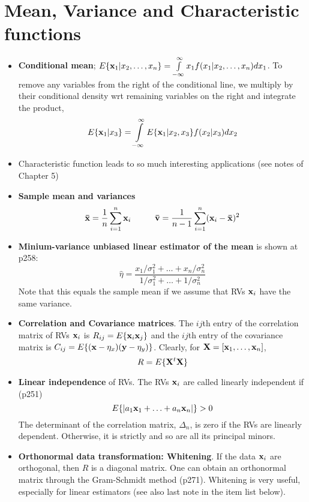 \documentclass[a4paper, oneside]{book}
\begin{document}
\section{Mean, Variance and Characteristic functions}
\begin{itemize} 
\item \textbf{Conditional mean}; \eg $E\{\mathbf x_1 | x_2,\hdots,x_n\} = \int\limits_{-\infty}^\infty x_1 f(x_1| x_2,\hdots,x_n) d x_1$. To remove any variables from the right of the conditional line, we multiply by their conditional density wrt remaining variables on the right and integrate the product, \eg %
$$E\{\mathbf x_1 | x_3\} = \int\limits_{-\infty}^\infty E\{\mathbf x_1 | x_2, x_3\} f(x_2|x_3) d x_2$$ 
\item Characteristic function leads to so much interesting applications (see notes of Chapter 5)
\item \textbf{Sample mean and variances}
$$\mb{\bar{x}} = \frac{1}{n} \sum\limits_{i=1}^n \mb x_i \hspace{1truecm} \mb{\bar{v}} = \frac{1}{n-1} \sum\limits_{i=1}^n (\mb x_i -\mb{\bar{x}})^2$$
\item \textbf{Minium-variance unbiased linear estimator of the mean} is shown at p258:
$$ \hat{\eta} = \frac{x_1/\sigma_1^2 + \hdots + x_n/\sigma_n^2}{1/\sigma_1^2 + \hdots + 1/\sigma_n^2} $$
Note that this equals the sample mean if we assume that RVs $\mathbf x_i$ have the same variance.  
\item \textbf{Correlation and Covariance matrices}. The $ij$th entry of the correlation matrix of RVs $\mathbf x_i$ is $R_{ij} = E\{ \mathbf x_i \mathbf x_j\}$ and the $ij$th entry of the covariance matrix is $C_{ij} = E\{(\mathbf x-\eta_x)(\mathbf y-\eta_y)\}$. Clearly, for $\mathbf X = [\mathbf x_1, \hdots, \mathbf x_n]$, 
$$R = E\{\mathbf X^t \mathbf X\}$$
\item \textbf{Linear independence} of RVs. The RVs $\mathbf{x}_i$ are called linearly independent if (p251) $$E\{|a_1 \mathbf x_1 + \hdots + a_n \mathbf x_n|\}>0$$
The determinant of the correlation matrix, $\Delta_n$, is zero if the RVs are linearly dependent. Otherwise, it is strictly and so are all its principal minors.
\item \textbf{Orthonormal data transformation: Whitening}. If the data $\mathbf x_i$ are orthogonal, then $R$ is a diagonal matrix. One can obtain an orthonormal matrix through the Gram-Schmidt method (p271). Whitening is very useful, especially for linear estimators (see also last note in the item list below).
\end{itemize}
 
\end{document}

